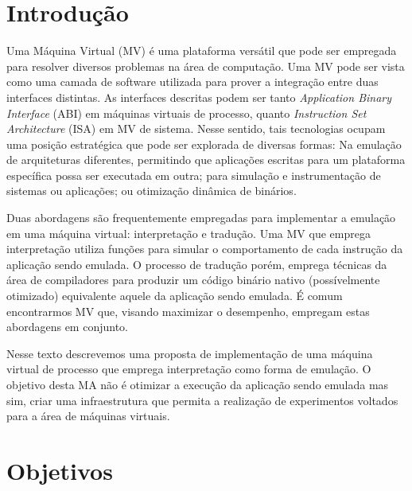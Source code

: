 \documentclass[11pt,twoside]{article}
\begin{document}
\section{Introdução}

Uma Máquina Virtual (MV) é uma plataforma versátil que pode ser empregada para resolver diversos problemas na área de computação. 
Uma MV pode ser vista como uma camada de software utilizada para prover a integração entre duas interfaces distintas.
As interfaces descritas podem ser tanto \emph{Application Binary Interface} (ABI) em máquinas virtuais de processo, quanto \emph{Instruction Set Architecture} (ISA) em MV de sistema.
Nesse sentido, tais tecnologias ocupam uma posição estratégica que pode ser explorada de diversas formas:
Na emulação de arquiteturas diferentes, permitindo que aplicações escritas para um plataforma específica possa ser executada em outra; para simulação e instrumentação de sistemas ou aplicações; ou otimização dinâmica de binários.

Duas abordagens são frequentemente empregadas para implementar a emulação em uma máquina virtual: interpretação e tradução.
Uma MV que emprega interpretação utiliza funções para simular o comportamento de cada instrução da aplicação sendo emulada. 
O processo de tradução porém, emprega técnicas da área de compiladores para produzir um código binário nativo (possívelmente otimizado) equivalente aquele da aplicação sendo emulada.
É comum encontrarmos MV que, visando maximizar o desempenho, empregam estas abordagens em conjunto.

Nesse texto descrevemos uma proposta de implementação de uma máquina virtual de processo que emprega interpretação como forma de emulação. 
O objetivo desta MA não é otimizar a execução da aplicação sendo emulada mas sim, criar uma infraestrutura que permita a realização de experimentos voltados para a área de máquinas virtuais.
   
\section{Objetivos}
% 
\end{document}
